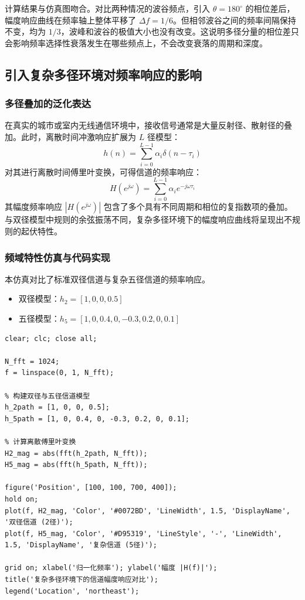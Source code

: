 \documentclass[a4paper, 11pt]{ctexart}
\begin{document}
计算结果与仿真图吻合。对比两种情况的波谷频点，引入 $\theta = 180^\circ$ 的相位差后，幅度响应曲线在频率轴上整体平移了 $\Delta f = 1/6$。但相邻波谷之间的频率间隔保持不变，均为 $1/3$，波峰和波谷的极值大小也没有改变。这说明多径分量的相位差只会影响频率选择性衰落发生在哪些频点上，不会改变衰落的周期和深度。

\subsection{引入复杂多径环境对频率响应的影响}

\subsubsection{多径叠加的泛化表达}
在真实的城市或室内无线通信环境中，接收信号通常是大量反射径、散射径的叠加。此时，离散时间冲激响应扩展为 $L$ 径模型：
\begin{equation}
    h(n) = \sum_{i=0}^{L-1} \alpha_i \delta(n - \tau_i)
\end{equation}
对其进行离散时间傅里叶变换，可得信道的频率响应：
\begin{equation}
    H(e^{j\omega}) = \sum_{i=0}^{L-1} \alpha_i e^{-j\omega\tau_i}
\end{equation}
其幅度频率响应 $|H(e^{j\omega})|$ 包含了多个具有不同周期和相位的复指数项的叠加。与双径模型中规则的余弦振荡不同，复杂多径环境下的幅度响应曲线将呈现出不规则的起伏特性。

\subsubsection{频域特性仿真与代码实现}
本仿真对比了标准双径信道与复杂五径信道的频率响应。
\begin{itemize}
    \item 双径模型：$h_2 = [1, 0, 0, 0.5]$
    \item 五径模型：$h_5 = [1, 0, 0.4, 0, -0.3, 0.2, 0, 0.1]$
\end{itemize}

\begin{lstlisting}[caption={复杂多径环境下的信道频率响应仿真代码}]
clear; clc; close all;

N_fft = 1024; 
f = linspace(0, 1, N_fft); 

% 构建双径与五径信道模型
h_2path = [1, 0, 0, 0.5];
h_5path = [1, 0, 0.4, 0, -0.3, 0.2, 0, 0.1];

% 计算离散傅里叶变换
H2_mag = abs(fft(h_2path, N_fft));
H5_mag = abs(fft(h_5path, N_fft));

figure('Position', [100, 100, 700, 400]);
hold on;
plot(f, H2_mag, 'Color', '#0072BD', 'LineWidth', 1.5, 'DisplayName', '双径信道 (2径)');
plot(f, H5_mag, 'Color', '#D95319', 'LineStyle', '-', 'LineWidth', 1.5, 'DisplayName', '复杂信道 (5径)');

grid on; xlabel('归一化频率'); ylabel('幅度 |H(f)|');
title('复杂多径环境下的信道幅度响应对比');
legend('Location', 'northeast');
\end{lstlisting}
\end{document}
